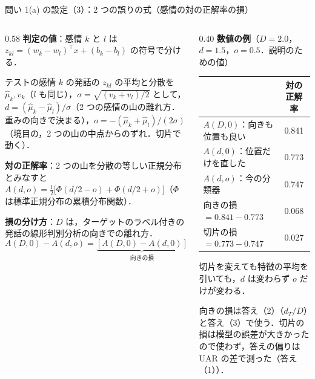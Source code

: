 \begin{frame}{問い 1(a) の設定（3）：2 つの誤りの式（感情の対の正解率の損）}
\scriptsize\setlength{\abovedisplayskip}{1pt}\setlength{\belowdisplayskip}{1pt}\setlength{\abovedisplayshortskip}{0pt}\setlength{\belowdisplayshortskip}{1pt}
\begin{columns}[T]
\begin{column}{0.58\textwidth}
\textbf{判定の値}：感情 $k$ と $l$ は $z_{kl}=(w_k-w_l)^\top x+(b_k-b_l)$ の符号で分ける．\par\smallskip
テストの感情 $k$ の発話の $z_{kl}$ の平均と分散を $\hat\mu_k, v_k$（$l$ も同じ），$\sigma=\sqrt{(v_k+v_l)/2}$ として，$d=(\hat\mu_k-\hat\mu_l)/\sigma$（2 つの感情の山の離れ方．重みの向きで決まる），$o=-(\hat\mu_k+\hat\mu_l)/(2\sigma)$（境目の，2 つの山の中点からのずれ．切片で動く）．\par\smallskip
\textbf{対の正解率}：2 つの山を分散の等しい正規分布とみなすと
$A(d,o)=\tfrac12\big[\Phi(d/2-o)+\Phi(d/2+o)\big]$（$\Phi$ は標準正規分布の累積分布関数）．\par\smallskip
\textbf{損の分け方}：$D$ は，ターゲットのラベル付きの発話の線形判別分析の向きでの離れ方．
\[
A(D,0)-A(d,o)=\underbrace{[A(D,0)-A(d,0)]}_{\text{向きの損}}+\underbrace{[A(d,0)-A(d,o)]}_{\text{切片の損}}
\]
\end{column}
\begin{column}{0.40\textwidth}
\textbf{数値の例}（$D=2.0$，$d=1.5$，$o=0.5$．説明のための値）\par\smallskip
{\centering
\begin{tabular}{@{}lc@{}}
\toprule
 & 対の正解率 \\
\midrule
$A(D,0)$：向きも位置も良い & 0.841 \\
$A(d,0)$：位置だけを直した & 0.773 \\
$A(d,o)$：今の分類器 & 0.747 \\
\midrule
向きの損 $=0.841-0.773$ & 0.068 \\
切片の損 $=0.773-0.747$ & 0.027 \\
\bottomrule
\end{tabular}\par}
\medskip
切片を変えても特徴の平均を引いても，$d$ は変わらず $o$ だけが変わる．\par\smallskip
向きの損は答え（2）（$d_T/D$）と答え（3）で使う．切片の損は模型の誤差が大きかったので使わず，答えの偏りは UAR の差で測った（答え（1））．
\end{column}
\end{columns}
\end{frame}

